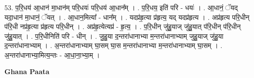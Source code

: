 \documentclass[17pt]{extarticle}
\begin{document}
53. प॒रि॒धय॑ आ॒धान॑ मा॒धान॑म् परि॒धयः॑ परि॒धय॑ आ॒धान᳚म् । . प॒रि॒धय॒ इति॑ परि - धयः॑ । . आ॒धानं॒ ॅयद् यदा॒धान॑ मा॒धानं॒ ॅयत् । . आ॒धान॒मित्या᳚ - धान᳚म् । . यदप्र॑हृ॒त्या प्र॑हृत्य॒ यद् यदप्र॑हृत्य । . अप्र॑हृत्य परि॒धीन् प॑रि॒धी नप्र॑हृ॒त्या प्र॑हृत्य परि॒धीन् । . अप्र॑हृ॒त्येत्यप्र॑ - हृ॒त्य॒ । . प॒रि॒धीन् जु॑हु॒याज् जु॑हु॒यात् प॑रि॒धीन् प॑रि॒धीन् जु॑हु॒यात् । . प॒रि॒धीनिति॑ परि - धीन् । . जु॒हु॒या द॒न्तरा॑धानाभ्या म॒न्तरा॑धानाभ्याम् जुहु॒याज् जु॑हु॒या द॒न्तरा॑धानाभ्याम् । . अ॒न्तरा॑धानाभ्याम् घा॒सम् घा॒स म॒न्तरा॑धानाभ्या म॒न्तरा॑धानाभ्याम् घा॒सम् । . अ॒न्तरा॑धानाभ्या॒मित्य॒न्तः - आ॒धा॒ना॒भ्या॒म् । \newline

\textbf{Ghana Paata } \newline
\end{document}
